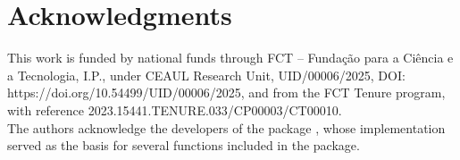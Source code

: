 \hypertarget{Acknowledgments}{%
\section*{Acknowledgments}}
This work is funded by national funds through FCT – Fundação para a Ciência e a Tecnologia, I.P., under CEAUL Research Unit, UID/00006/2025, DOI: https://doi.org/10.54499/UID/00006/2025, and from the FCT Tenure program, with reference
2023.15441.TENURE.033/CP00003/CT00010.\\

The authors acknowledge the developers of the  package \citep{Klau2018prioritylasso,klau2017prioritylasso}, whose implementation served as the basis for several functions included in the  package.



\address{%
Laila Musib\\
Faculdade de Ciências da Universidade de Lisboa \\%
Centro de Estatística e  Aplicações da Universidade de Lisboa (CEAUL)\\%
Campo Grande 016, 1749-016 Lisboa, Portugal\\%
}

\address{%
Helena Mouriño\\
Faculdade de Ciências da Universidade de Lisboa \\%
Centro de Estatística e  Aplicações da Universidade de Lisboa (CEAUL)\\%
Campo Grande 016, 1749-016 Lisboa, Portugal\\%
}

\address{
Eunice Carrasquinha\\
Faculdade de Ciências da Universidade de Lisboa \\%
Centro de Estatística e  Aplicações da Universidade de Lisboa (CEAUL)\\%
Campo Grande 016, 1749-016 Lisboa, Portugal\\%
}
